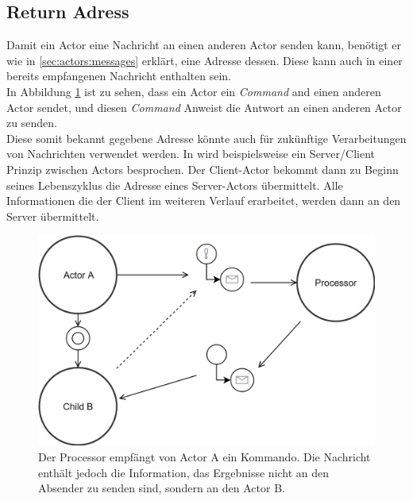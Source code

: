 
\subsection{Return Adress}
Damit ein Actor eine Nachricht an einen anderen Actor senden kann, benötigt er wie in \ref{sec:actors:messages} erklärt, eine Adresse dessen. Diese kann auch in einer bereits empfangenen Nachricht enthalten sein. \\
In Abbildung \ref{fig:actor:patterns:returnAdress} ist zu sehen, dass ein Actor ein \textit{Command} and einen anderen Actor sendet, und diesen \textit{Command} Anweist die Antwort an einen anderen Actor zu senden. \\
Diese somit bekannt gegebene Adresse könnte auch für zukünftige Verarbeitungen von Nachrichten verwendet werden. In \cite{Vernon2015ReactiveAkka} wird beispielsweise ein Server/Client Prinzip zwischen Actors besprochen. Der Client-Actor bekommt dann zu Beginn seines Lebenszyklus die Adresse eines Server-Actors übermittelt. Alle Informationen die der Client im weiteren Verlauf erarbeitet, werden dann an den Server übermittelt.

\begin{figure}
    \centering
    \includegraphics[width=\linewidth]{gfx/actor/patterns/returnAddress}
    \caption{Der Processor empfängt von Actor A ein Kommando. Die Nachricht enthält jedoch die Information, das Ergebnisse nicht an den Absender zu senden sind, sondern an den Actor B.}
    \label{fig:actor:patterns:returnAdress}
\end{figure}


